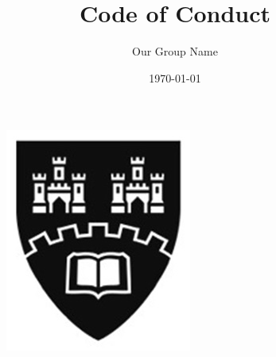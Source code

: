 \documentclass[11pt]{article}
\begin{document}

\begin{figure}[t]
	\includegraphics[scale=0.75]{northumbria_logo.jpg}
	\centering
\end{figure}	
\title{Code of Conduct}
\author{Our Group Name}
\date{\today}
\maketitle

\newpage

%	
\end{document}
